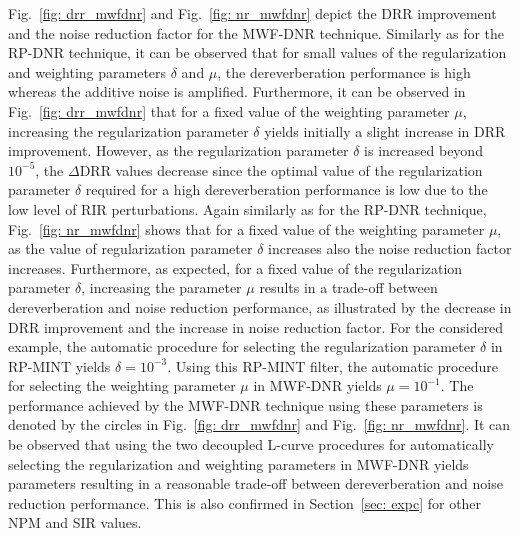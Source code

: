 \documentclass[draftcls,onecolumn,11pt]{IEEEtran}
\begin{document}
Fig.~\ref{fig: drr_mwfdnr} and Fig.~\ref{fig: nr_mwfdnr} depict the DRR improvement and the noise reduction factor for the MWF-DNR technique. 
Similarly as for the RP-DNR technique, it can be observed that for small values of the regularization and weighting parameters $\delta$ and $\mu$, the dereverberation performance is high whereas the additive noise is amplified. 
Furthermore, it can be observed in Fig.~\ref{fig: drr_mwfdnr} that for a fixed value of the weighting parameter $\mu$, increasing the regularization parameter $\delta$ yields initially a slight increase in DRR improvement. 
However, as the regularization parameter $\delta$ is increased beyond $10^{-5}$, the $\Delta$DRR values decrease since the optimal value of the regularization parameter $\delta$ required for a high dereverberation performance is low due to the low level of RIR perturbations.
Again similarly as for the RP-DNR technique, Fig.~\ref{fig: nr_mwfdnr} shows that for a fixed value of the weighting parameter $\mu$, as the value of regularization parameter $\delta$ increases also the noise reduction factor increases. 
Furthermore, as expected, for a fixed value of the regularization parameter $\delta$, increasing the parameter $\mu$ results in a trade-off between dereverberation and noise reduction performance, as illustrated by the decrease in DRR improvement and the increase in noise reduction factor. 
For the considered example, the automatic procedure for selecting the regularization parameter $\delta$ in RP-MINT yields $\delta = 10^{-3}$. 
Using this RP-MINT filter, the automatic procedure for selecting the weighting parameter $\mu$ in MWF-DNR yields $\mu = 10^{-1}$.
The performance achieved by the MWF-DNR technique using these parameters is denoted by the circles in Fig.~\ref{fig: drr_mwfdnr} and Fig.~\ref{fig: nr_mwfdnr}.
It can be observed that using the two decoupled L-curve procedures for automatically selecting the regularization and weighting parameters in MWF-DNR yields parameters resulting in a reasonable trade-off between dereverberation and noise reduction performance.
This is also confirmed in Section~\ref{sec: expc} for other NPM and SIR values.
\end{document}
